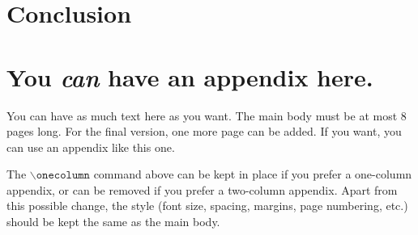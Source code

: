 \documentclass{article}
\theoremstyle{plain}
\theoremstyle{definition}
\theoremstyle{remark}
\begin{document}
\section{Conclusion}

\nocite{langley00}





\newpage
\appendix
\onecolumn
\section{You \emph{can} have an appendix here.}

You can have as much text here as you want. The main body must be at most $8$ pages long.
For the final version, one more page can be added.
If you want, you can use an appendix like this one.  

The $\mathtt{\backslash onecolumn}$ command above can be kept in place if you prefer a one-column appendix, or can be removed if you prefer a two-column appendix.  Apart from this possible change, the style (font size, spacing, margins, page numbering, etc.) should be kept the same as the main body.
\end{document}
